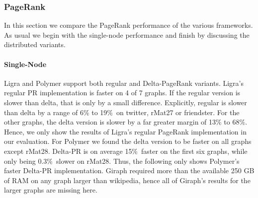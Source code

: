 

\subsubsection{PageRank}
In this section we compare the PageRank performance of the various frameworks. As usual we begin with the single-node performance and finish by discussing the distributed variants.

\paragraph{Single-Node}
Ligra and Polymer support both regular and Delta-PageRank variants.
Ligra's regular PR implementation is faster on 4 of 7 graphs. If the regular version is slower than delta, that is only by a small difference. Explicitly, regular is slower than delta by a range of 6\% to 19\%\ on twitter, rMat27 or friendster. For the other graphs, the delta version is slower by a far greater margin of 13\% to 68\%.
Hence, we only show the results of Ligra's regular PageRank implementation in our evaluation.
For Polymer we found the delta version to be faster on all graphs except rMat28. Delta-PR is on average 15\%\ faster on the first six graphs, while only being 0.3\%\ slower on rMat28.
Thus, the following only shows Polymer's faster Delta-PR implementation.
Giraph required more than the available 250 GB of RAM on any graph larger than wikipedia, hence all of Giraph's results for the larger graphs are missing here.
